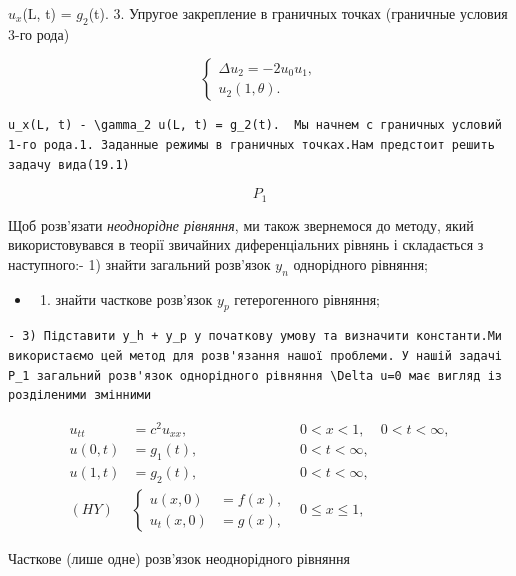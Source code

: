 \documentclass[
  ukrainian,
]{article}
\providecommand{\tightlist}{%
  \setlength{\itemsep}{0pt}\setlength{\parskip}{0pt}}
\begin{document}
\(u_x\)(L, t) = \(g_2\)(t). 3. Упругое закрепление в граничных точках
(граничные условия 3-го рода)

\[
\begin{cases} \Delta u_{2} = -2u_{0}u_{1}, \\ u_{2}(1, \theta). \end{cases}
\]

\begin{verbatim}
u_x(L, t) - \gamma_2 u(L, t) = g_2(t).  Мы начнем с граничных условий 1-го рода.1. Заданные режимы в граничных точках.Нам предстоит решить задачу вида(19.1)
\end{verbatim}

\[
P_{1}
\]

Щоб розв'язати \emph{неоднорідне рівняння}, ми також звернемося до
методу, який використовувався в теорії звичайних диференціальних рівнянь
і складається з наступного:- 1) знайти загальний розв'язок \(y_n\)
однорідного рівняння;

\begin{itemize}
\tightlist
\item
  \begin{enumerate}
  \def\labelenumi{\arabic{enumi})}
  \setcounter{enumi}{1}
  \tightlist
  \item
    знайти часткове розв'язок \(y_p\) гетерогенного рівняння;
  \end{enumerate}
\end{itemize}

\begin{verbatim}
- 3) Підставити y_h + y_p у початкову умову та визначити константи.Ми використаємо цей метод для розв'язання нашої проблеми. У нашій задачі P_1 загальний розв'язок однорідного рівняння \Delta u=0 має вигляд із розділеними змінними
\end{verbatim}

\[
\begin{aligned} u_{tt} &= c^2 u_{xx}, & 0 < x < 1, & 0 < t < \infty, \\ u(0, t) &= g_1(t), & 0 < t < \infty, \\ u(1, t) &= g_2(t), & 0 < t < \infty, \\ (HY) &\begin{cases} u(x, 0) &= f(x), \\ u_t(x, 0) &= g(x), \end{cases} & 0 \leqslant x \leqslant 1, \end{aligned}
\]

Часткове (лише одне) розв'язок неоднорідного рівняння
\end{document}
